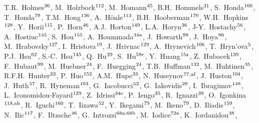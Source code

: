 \begin{flushleft}
T.R.~Holmes$^\textrm{\scriptsize 36}$,    
M.~Holzbock$^\textrm{\scriptsize 112}$,    
M.~Homann$^\textrm{\scriptsize 45}$,    
B.H.~Hommels$^\textrm{\scriptsize 31}$,    
S.~Honda$^\textrm{\scriptsize 166}$,    
T.~Honda$^\textrm{\scriptsize 79}$,    
T.M.~Hong$^\textrm{\scriptsize 136}$,    
A.~H\"{o}nle$^\textrm{\scriptsize 113}$,    
B.H.~Hooberman$^\textrm{\scriptsize 170}$,    
W.H.~Hopkins$^\textrm{\scriptsize 128}$,    
Y.~Horii$^\textrm{\scriptsize 115}$,    
P.~Horn$^\textrm{\scriptsize 46}$,    
A.J.~Horton$^\textrm{\scriptsize 149}$,    
L.A.~Horyn$^\textrm{\scriptsize 36}$,    
J-Y.~Hostachy$^\textrm{\scriptsize 56}$,    
A.~Hostiuc$^\textrm{\scriptsize 145}$,    
S.~Hou$^\textrm{\scriptsize 155}$,    
A.~Hoummada$^\textrm{\scriptsize 34a}$,    
J.~Howarth$^\textrm{\scriptsize 98}$,    
J.~Hoya$^\textrm{\scriptsize 86}$,    
M.~Hrabovsky$^\textrm{\scriptsize 127}$,    
I.~Hristova$^\textrm{\scriptsize 19}$,    
J.~Hrivnac$^\textrm{\scriptsize 129}$,    
A.~Hrynevich$^\textrm{\scriptsize 106}$,    
T.~Hryn'ova$^\textrm{\scriptsize 5}$,    
P.J.~Hsu$^\textrm{\scriptsize 62}$,    
S.-C.~Hsu$^\textrm{\scriptsize 145}$,    
Q.~Hu$^\textrm{\scriptsize 29}$,    
S.~Hu$^\textrm{\scriptsize 58c}$,    
Y.~Huang$^\textrm{\scriptsize 15a}$,    
Z.~Hubacek$^\textrm{\scriptsize 139}$,    
F.~Hubaut$^\textrm{\scriptsize 99}$,    
M.~Huebner$^\textrm{\scriptsize 24}$,    
F.~Huegging$^\textrm{\scriptsize 24}$,    
T.B.~Huffman$^\textrm{\scriptsize 132}$,    
M.~Huhtinen$^\textrm{\scriptsize 35}$,    
R.F.H.~Hunter$^\textrm{\scriptsize 33}$,    
P.~Huo$^\textrm{\scriptsize 152}$,    
A.M.~Hupe$^\textrm{\scriptsize 33}$,    
N.~Huseynov$^\textrm{\scriptsize 77,af}$,    
J.~Huston$^\textrm{\scriptsize 104}$,    
J.~Huth$^\textrm{\scriptsize 57}$,    
R.~Hyneman$^\textrm{\scriptsize 103}$,    
G.~Iacobucci$^\textrm{\scriptsize 52}$,    
G.~Iakovidis$^\textrm{\scriptsize 29}$,    
I.~Ibragimov$^\textrm{\scriptsize 148}$,    
L.~Iconomidou-Fayard$^\textrm{\scriptsize 129}$,    
Z.~Idrissi$^\textrm{\scriptsize 34e}$,    
P.~Iengo$^\textrm{\scriptsize 35}$,    
R.~Ignazzi$^\textrm{\scriptsize 39}$,    
O.~Igonkina$^\textrm{\scriptsize 118,ab}$,    
R.~Iguchi$^\textrm{\scriptsize 160}$,    
T.~Iizawa$^\textrm{\scriptsize 52}$,    
Y.~Ikegami$^\textrm{\scriptsize 79}$,    
M.~Ikeno$^\textrm{\scriptsize 79}$,    
D.~Iliadis$^\textrm{\scriptsize 159}$,    
N.~Ilic$^\textrm{\scriptsize 117}$,    
F.~Iltzsche$^\textrm{\scriptsize 46}$,    
G.~Introzzi$^\textrm{\scriptsize 68a,68b}$,    
M.~Iodice$^\textrm{\scriptsize 72a}$,    
K.~Iordanidou$^\textrm{\scriptsize 38}$,    

\end{flushleft}
